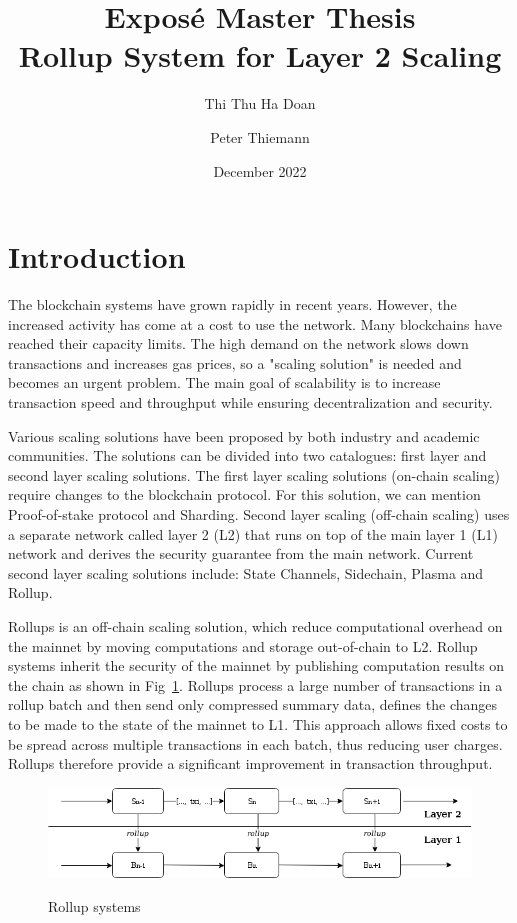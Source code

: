 \documentclass{article}
\title{Expos\'{e} Master Thesis\\
  Rollup System for Layer 2 Scaling}
\author{Thi Thu Ha Doan \and  Peter Thiemann}
\date{December 2022}
\begin{document}
\maketitle

\section{Introduction}
The blockchain systems have grown rapidly in recent years. However, the increased activity has come at a cost to use the network. Many blockchains have reached their capacity limits. The high demand on the network slows down transactions and increases gas prices, so a "scaling solution" is needed and becomes an urgent problem. The main goal of scalability is to increase transaction speed and throughput while ensuring decentralization and security.

Various scaling solutions have been proposed by both industry and academic communities. The solutions can be divided into two catalogues: first layer and second layer scaling solutions. The first layer scaling solutions (on-chain scaling) require changes to the blockchain protocol. For this solution, we can mention Proof-of-stake protocol and Sharding. Second layer scaling (off-chain scaling)  uses a separate network called layer 2 (L2) that runs on top of the main layer 1 (L1) network and derives the security guarantee from the main network. Current second layer scaling solutions include: State Channels, Sidechain, Plasma and Rollup.

Rollups is an off-chain scaling solution, which reduce computational overhead on the mainnet by moving computations and storage out-of-chain to L2. Rollup systems inherit the security of the mainnet by publishing computation results on the chain as shown in Fig~\ref{rollup-batch}. Rollups process a large number of transactions in a rollup batch and then send only  compressed summary data, defines the changes to be made to the state of the mainnet  to L1. This approach allows fixed costs to be spread across multiple transactions in each batch, thus reducing user charges. Rollups therefore provide a significant improvement in transaction throughput. 

\begin{figure}[t]
\caption{Rollup systems}
\includegraphics[width=12cm]{rollup-batch}
\label{rollup-batch}
\centering
\end{figure}
\end{document}
